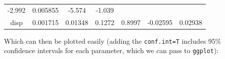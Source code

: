 \documentclass[]{article}
\newenvironment{Shaded}{\begin{snugshade}}{\end{snugshade}}
\newcommand{\KeywordTok}[1]{\textcolor[rgb]{0.13,0.29,0.53}{\textbf{#1}}}
\newcommand{\DataTypeTok}[1]{\textcolor[rgb]{0.13,0.29,0.53}{#1}}
\newcommand{\DecValTok}[1]{\textcolor[rgb]{0.00,0.00,0.81}{#1}}
\newcommand{\StringTok}[1]{\textcolor[rgb]{0.31,0.60,0.02}{#1}}
\newcommand{\OperatorTok}[1]{\textcolor[rgb]{0.81,0.36,0.00}{\textbf{#1}}}
\newcommand{\NormalTok}[1]{#1}
\theoremstyle{definition}
\theoremstyle{definition}
\theoremstyle{definition}
\theoremstyle{remark}
\begin{document}
\begin{longtable}[]{@{}ccccccc@{}}
\begin{minipage}[t]{0.12\columnwidth}
-2.992\strut
\end{minipage} & \begin{minipage}[t]{0.12\columnwidth}\centering\strut
0.005855\strut
\end{minipage} & \begin{minipage}[t]{0.11\columnwidth}\centering\strut
-5.574\strut
\end{minipage} & \begin{minipage}[t]{0.11\columnwidth}\centering\strut
-1.039\strut
\end{minipage}\tabularnewline
\begin{minipage}[t]{0.14\columnwidth}\centering\strut
disp\strut
\end{minipage} & \begin{minipage}[t]{0.11\columnwidth}\centering\strut
0.001715\strut
\end{minipage} & \begin{minipage}[t]{0.12\columnwidth}\centering\strut
0.01348\strut
\end{minipage} & \begin{minipage}[t]{0.12\columnwidth}\centering\strut
0.1272\strut
\end{minipage} & \begin{minipage}[t]{0.12\columnwidth}\centering\strut
0.8997\strut
\end{minipage} & \begin{minipage}[t]{0.11\columnwidth}\centering\strut
-0.02595\strut
\end{minipage} & \begin{minipage}[t]{0.11\columnwidth}\centering\strut
0.02938\strut
\end{minipage}\tabularnewline
\bottomrule
\end{longtable}

Which can then be plotted easily (adding the \texttt{conf.int=T}
includes 95\% confidence intervals for each parameter, which we can pass
to \texttt{ggplot}):

\begin{Shaded}
\end{Shaded}
\end{document}

